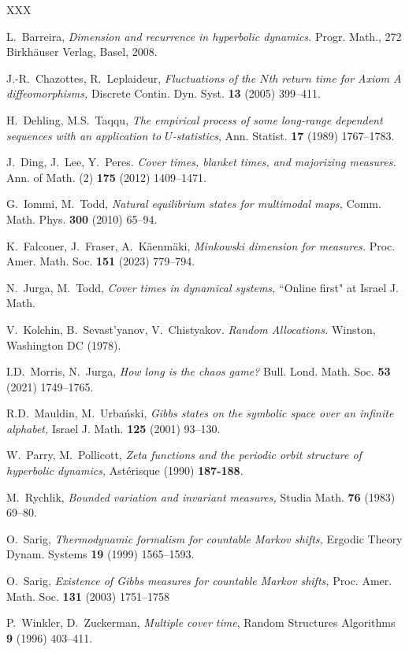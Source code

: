 \documentclass[11pt, reqno]{amsart}
\numberwithin{equation}{section}
\theoremstyle{plain}%
\theoremstyle{definition}
\theoremstyle{nonumberplain}
\begin{document}
\begin{thebibliography}{XXX}

 L.\ Barreira, \emph{Dimension and recurrence in hyperbolic dynamics.}
Progr. Math., 272
Birkhäuser Verlag, Basel, 2008.

 J.-R.\ Chazottes, R.\ Leplaideur, \emph{Fluctuations of the $N$th return time for {A}xiom {A}
diffeomorphisms,} Discrete Contin. Dyn. Syst. \textbf{13} (2005) 399--411.

 H.\ Dehling, M.S.\ Taqqu, \emph{The empirical process of some long-range dependent sequences with an application to $U$-statistics}, Ann. Statist. \textbf{17} (1989) 1767--1783.

 J.\ Ding, J.\ Lee, Y.\ Peres. \emph{Cover times, blanket times, and majorizing measures.} Ann. of Math. (2) \textbf{175} (2012) 1409--1471.

 G.\ Iommi, M.\ Todd, 
\emph{Natural equilibrium states for multimodal maps,}
 Comm. Math. Phys. \textbf{300} (2010) 65--94.


 K.\ Falconer, J.\  Fraser, A.\ Käenmäki, \emph{Minkowski dimension for measures.} Proc. Amer. Math. Soc. \textbf{151} (2023) 779--794.

 N.\ Jurga, M.\ Todd, \emph{Cover times in dynamical systems,} ``Online first" at Israel J. Math.

 V.\ Kolchin, B.\ Sevast'yanov, V.\ Chistyakov. \emph{Random Allocations.} Winston, Washington DC (1978).

  I.D.\ Morris, N.\ Jurga, \emph{How long is the chaos game?} Bull. Lond. Math. Soc. \textbf{53}  (2021) 1749--1765.

 R.D.\ Mauldin, M.\ Urba\'nski, 
\emph{Gibbs states on the symbolic space over an infinite alphabet,}
 Israel J. Math. \textbf{125} (2001) 93--130. 

 W.\ Parry, M.\ Pollicott, 
\emph{Zeta functions and the periodic orbit structure of hyperbolic
dynamics,}  Ast\'erisque (1990) \textbf{187-188}.

 M.\ Rychlik, \emph{Bounded variation and invariant measures,} Studia Math. \textbf{76} (1983) 69--80.

 O.\ Sarig, \emph{Thermodynamic formalism for countable Markov shifts,} Ergodic Theory Dynam. Systems \textbf{19} (1999) 1565--1593.

 O.\ Sarig, \emph{Existence of Gibbs measures for countable Markov shifts,} Proc. Amer. Math. Soc. \textbf{131} (2003) 1751--1758 

 P.\ Winkler, D.\ Zuckerman, 
\emph{Multiple cover time}, Random Structures Algorithms \textbf{9} (1996)
 403--411.

\end{thebibliography}
\end{document}
